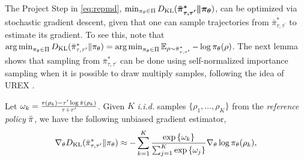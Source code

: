The Project Step in \cref{eq:repmd}, $\min\nolimits_{\pi_\theta \in \Pi}{D_{\mathrm{KL}}(\bm{ \bar{\pi}_{\tau,\tau^{\prime}}^* \| \pi_\theta }) }$, can be optimized via stochastic gradient descent, given that one can sample trajectories from $\bar{\pi}_{\tau,\tau^{\prime}}^*$ to estimate its gradient. To see this, note that $\operatorname*{arg\,min}\nolimits_{\pi_\theta \in \Pi}D_{\mathrm{KL}}(\bar{\pi}_{\tau,\tau^{\prime}}^* \| \pi_\theta) = \operatorname*{arg\,min}\nolimits_{\pi_\theta \in \Pi} \operatorname*{\mathbb{E}}_{\rho \sim \bar{\pi}_{\tau,\tau^{\prime}}^* }  - \log \pi_\theta(\rho)$. The next lemma shows that sampling from $\bar{\pi}_{\tau,\tau^{\prime}}^*$ can be done using self-normalized importance sampling \citep{owen2013monte} when it is possible to draw multiply samples, following the idea of UREX \citep{nachum2017improving}.   
\begin{lem}
\label{lem:repmdgradientestimate}
Let $\omega_k = \frac{r(\rho_k) - \tau^{\prime} \log{\bar{\pi}(\rho_k)} }{\tau + \tau^{\prime}}$. Given $K$ \emph{i.i.d.} samples $\{\rho_1, \dots, \rho_K\}$ from the \emph{reference policy} $\bar{\pi}$, we have the following unbiased gradient estimator,
\begin{equation}
\label{eq:gradient_estimator}
	\nabla_{\theta} D_{\mathrm{KL}}(\bar{\pi}_{\tau,\tau^{\prime}}^* \| \pi_\theta)\approx -\sum\limits_{k=1}^K{ \frac{ \exp\left\{ \omega_k \right\} }{ \sum_{j=1}^K{ \exp\left\{ \omega_j \right\}}} \nabla_{\theta} \log{\pi_\theta(\rho_k)} },
\end{equation}
\end{lem}
